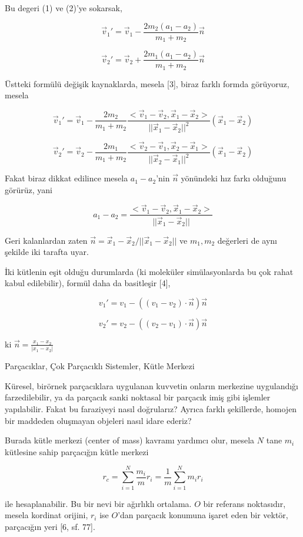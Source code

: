 \documentclass[12pt,fleqn]{article}\usepackage{../../common}
\begin{document}
Bu degeri (1) ve (2)'ye sokarsak,


$$
\vec{v}_1' = \vec{v}_1 - \frac{2 m_2 (a_1-a_2)}{m_1+m_2} \vec{n}
$$

$$
\vec{v}_2' = \vec{v}_2 + \frac{2 m_1 (a_1-a_2)}{m_1+m_2} \vec{n}
$$

Üstteki formülü değişik kaynaklarda, mesela [3], biraz farklı formda görüyoruz,
mesela

$$
\vec{v}_1' =
\vec{v}_1 - \frac{2m_2}{m_1+m_2}
\frac{< \vec{v}_1-\vec{v}_2, \vec{x}_1-\vec{x}_2 >}{||\vec{x}_1-\vec{x}_2||^2}
(\vec{x}_1-\vec{x}_2)
$$

$$
\vec{v}_2' =
\vec{v}_2 - \frac{2m_1}{m_1+m_2}
\frac{< \vec{v}_2-\vec{v}_1, \vec{x}_2-\vec{x}_1 >}{||\vec{x}_2-\vec{x}_1||^2}
(\vec{x}_1-\vec{x}_2)
$$

Fakat biraz dikkat edilince mesela $a_1-a_2$'nin $\vec{n}$ yönündeki hız farkı
olduğunu görürüz, yani

$$
a_1-a_2=\frac{< \vec{v}_1-\vec{v}_2,\vec{x}_1-\vec{x}_2 >}{||\vec{x}_1-\vec{x}_2||}
$$

Geri kalanlardan zaten $\vec{n} = \vec{x}_1-\vec{x}_2/||\vec{x}_1-\vec{x}_2||$
ve $m_1,m_2$ değerleri de aynı şekilde iki tarafta uyar.

İki kütlenin eşit olduğu durumlarda (ki moleküler simülasyonlarda bu çok rahat
kabul edilebilir), formül daha da basitleşir [4],

$$
v_1' = v_1 - \left( (v_1-v_2)  \cdot \vec{n} \right) \vec{n}
$$

$$
v_2' = v_2 - \left( (v_2-v_1)  \cdot \vec{n} \right) \vec{n}
$$

ki $\vec{n} = \frac{x_1-x_2}{|x_1-x_2|}$

Parçacıklar, Çok Parçacıklı Sistemler, Kütle Merkezi

Küresel, birörnek parçacıklara uygulanan kuvvetin onların merkezine uygulandığı
farzedilebilir, ya da parçacık sanki noktasal bir parçacık imiş gibi işlemler
yapılabilir. Fakat bu faraziyeyi nasıl doğrularız? Ayrıca farklı şekillerde,
homojen bir maddeden oluşmayan objeleri nasıl idare ederiz?

Burada kütle merkezi (center of mass) kavramı yardımcı olur, mesela $N$ tane
$m_i$ kütlesine sahip parçacığın kütle merkezi

$$
r_c =
\sum _{i=1}^{N} \frac{m_i}{m} r_i =
\frac{1}{m} \sum _{i=1}^{N} m_i r_i
$$

ile hesaplanabilir. Bu bir nevi bir ağırlıklı ortalama. $O$ bir referans
noktasıdır, mesela kordinat orijini, $r_i$ ise $O$'dan parçacık konumuna işaret
eden bir vektör, parçacığın yeri [6, sf. 77].
\end{document}
